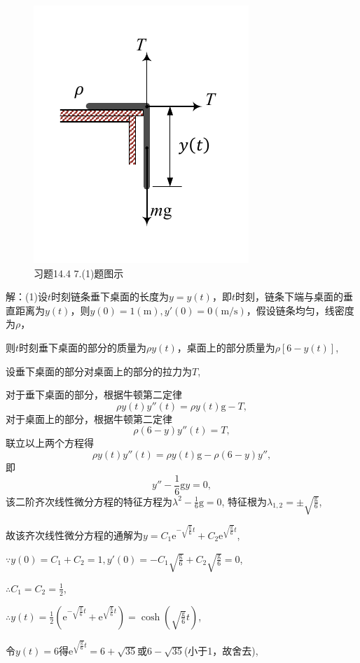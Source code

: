 \documentclass[12pt,UTF8]{ctexart}
\newcommand{\me}[0]{\mathrm e}
\begin{document}
\begin{enumerate}
\begin{figure}[H]
\begin{center}
\includegraphics[height=0.5\textheight]{Figures27/14-4-7-2.pdf}
\end{center}
\caption{习题14.4 7.(1)题图示}
\end{figure}

解：(1)设$t$时刻链条垂下桌面的长度为$y=y(t)$，即$t$时刻，链条下端与桌面的垂直距离为$y(t)$，则$y(0)=1(\text{m}),y'(0)=0(\text{m/s})$，假设链条均匀，线密度为$\rho$，

则$t$时刻垂下桌面的部分的质量为$\rho y(t)$，桌面上的部分质量为$\rho[6-y(t)]$,

设垂下桌面的部分对桌面上的部分的拉力为$T$,

对于垂下桌面的部分，根据牛顿第二定律
\[\rho y(t)y''(t)=\rho y(t)\text{g}-T,\]
对于桌面上的部分，根据牛顿第二定律
\[\rho(6-y)y''(t)=T,\]
联立以上两个方程得
\[\rho y(t)y''(t)=\rho y(t)\text{g}-\rho(6-y)y'',\]
即
\[y''-\frac16\text{g}y=0,\]
该二阶齐次线性微分方程的特征方程为$\lambda^2-\frac16\text{g}=0$, 特征根为$\lambda_{1,2}=\pm\sqrt{\frac{\text{g}}6}$,

故该齐次线性微分方程的通解为$y=C_1\me^{-\sqrt{\frac{\text{g}}6}t}+C_2\me^{\sqrt{\frac{\text{g}}6}t}$,

$\because y(0)=C_1+C_2=1,y'(0)=-C_1\sqrt{\frac{\text{g}}6}+C_2\sqrt{\frac{\text{g}}6}=0$,

$\therefore C_1=C_2=\frac12$,

$\therefore y(t)=\frac12(\me^{-\sqrt{\frac{\text{g}}6}t}+\me^{\sqrt{\frac{\text{g}}6}t})=\cosh(\sqrt{\frac{\text{g}}6}t)$,

令$y(t)=6$得$\me^{\sqrt{\frac{\text{g}}6}t}=6+\sqrt{35}$或$6-\sqrt{35}$(小于1，故舍去),


\end{enumerate}
\end{document}
